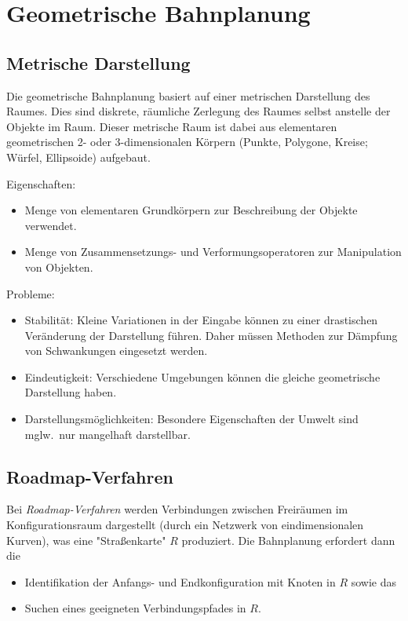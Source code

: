 \documentclass[a4paper, 11pt, accentcolor = tud3b]{tudreport}
\newcommand{\mglw}{mglw.~}
\begin{document}
		\section{Geometrische Bahnplanung}
			\subsection{Metrische Darstellung}
				Die geometrische Bahnplanung basiert auf einer metrischen Darstellung des Raumes. Dies sind diskrete, räumliche Zerlegung des Raumes selbst anstelle der Objekte im Raum. Dieser metrische Raum ist dabei aus elementaren geometrischen 2- oder 3-dimensionalen Körpern (Punkte, Polygone, Kreise; Würfel, Ellipsoide) aufgebaut.
				
				Eigenschaften:
				\begin{itemize}
					\item Menge von elementaren Grundkörpern zur Beschreibung der Objekte verwendet.
					\item Menge von Zusammensetzungs- und Verformungsoperatoren zur Manipulation von Objekten.
				\end{itemize}
			
				Probleme:
				\begin{itemize}
					\item Stabilität: Kleine Variationen in der Eingabe können zu einer drastischen Veränderung der Darstellung führen. Daher müssen Methoden zur Dämpfung von Schwankungen eingesetzt werden.
					\item Eindeutigkeit: Verschiedene Umgebungen können die gleiche geometrische Darstellung haben.
					\item Darstellungsmöglichkeiten: Besondere Eigenschaften der Umwelt sind \mglw nur mangelhaft darstellbar.
				\end{itemize}

			\subsection{Roadmap-Verfahren} 
				Bei \emph{Roadmap-Verfahren} werden Verbindungen zwischen Freiräumen im Konfigurationsraum dargestellt (durch ein Netzwerk von eindimensionalen Kurven), was eine "Straßenkarte" \(R\) produziert. Die Bahnplanung erfordert dann die
				\begin{itemize}
					\item Identifikation der Anfangs- und Endkonfiguration mit Knoten in \(R\) sowie das
					\item Suchen eines geeigneten Verbindungspfades in \(R\).
				\end{itemize}
				
\end{document}
